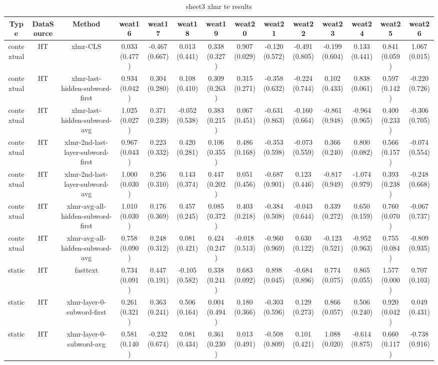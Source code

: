 \begin{sidewaystable}[htb]
    \centering
    \caption{sheet3 xlmr te results}
    \label{appendix_tab:sheet3_xlmr_te_results}
    \small
    \begin{tabular}{@{}cccccccccccccc@{}}
        \toprule
        Type & DataSource & Method & weat16 & weat17 & weat18 & weat19 & weat20 & weat21 & weat22 & weat23 & weat24 & weat25 & weat26 \\
        \midrule
        contextual & HT & xlmr-CLS & 0.033 (0.477) & -0.467 (0.667) & 0.013 (0.441) & 0.338 (0.327) & 0.907 (0.029) & -0.120 (0.572) & -0.491 (0.805) & -0.199 (0.604) & 0.133 (0.441) & 0.841 (0.059) & 1.067 (0.015) \\
        contextual & HT & xlmr-last-hidden-subword-first & 0.934 (0.042) & 0.304 (0.280) & 0.108 (0.410) & 0.309 (0.263) & 0.315 (0.271) & -0.358 (0.632) & -0.224 (0.744) & 0.102 (0.433) & 0.838 (0.061) & 0.597 (0.142) & -0.220 (0.726) \\
        contextual & HT & xlmr-last-hidden-subword-avg & 1.025 (0.027) & 0.371 (0.239) & -0.052 (0.538) & 0.383 (0.215) & 0.067 (0.451) & -0.631 (0.863) & -0.160 (0.664) & -0.861 (0.948) & -0.964 (0.965) & 0.400 (0.233) & -0.306 (0.705) \\
        contextual & HT & xlmr-2nd-last-layer-subword-first & 0.967 (0.043) & 0.223 (0.332) & 0.420 (0.281) & 0.106 (0.355) & 0.486 (0.168) & -0.353 (0.598) & -0.073 (0.559) & 0.366 (0.240) & 0.800 (0.082) & 0.566 (0.157) & -0.074 (0.554) \\
        contextual & HT & xlmr-2nd-last-layer-subword-avg & 1.000 (0.030) & 0.256 (0.310) & 0.143 (0.374) & 0.447 (0.202) & 0.051 (0.456) & -0.687 (0.901) & 0.123 (0.446) & -0.817 (0.949) & -1.074 (0.979) & 0.393 (0.238) & -0.248 (0.668) \\
        contextual & HT & xlmr-avg-all-hidden-subword-first & 1.010 (0.030) & 0.176 (0.369) & 0.457 (0.245) & 0.085 (0.372) & 0.403 (0.218) & -0.384 (0.508) & -0.043 (0.644) & 0.339 (0.272) & 0.650 (0.159) & 0.760 (0.070) & -0.067 (0.737) \\
        contextual & HT & xlmr-avg-all-hidden-subword-avg & 0.758 (0.090) & 0.248 (0.312) & 0.081 (0.421) & 0.424 (0.247) & -0.018 (0.513) & -0.960 (0.969) & 0.630 (0.122) & -0.123 (0.521) & -0.952 (0.963) & 0.755 (0.084) & -0.809 (0.935) \\
        static & HT & fasttext & 0.734 (0.091) & 0.447 (0.191) & -0.105 (0.582) & 0.338 (0.241) & 0.683 (0.092) & 0.898 (0.045) & -0.684 (0.896) & 0.774 (0.075) & 0.865 (0.055) & 1.577 (0.000) & 0.707 (0.103) \\
        static & HT & xlmr-layer-0-subword-first & 0.261 (0.321) & 0.363 (0.241) & 0.506 (0.164) & 0.004 (0.494) & 0.180 (0.366) & -0.303 (0.596) & 0.129 (0.273) & 0.866 (0.057) & 0.506 (0.240) & 0.920 (0.042) & 0.049 (0.431) \\
        static & HT & xlmr-layer-0-subword-avg & 0.581 (0.140) & -0.232 (0.674) & 0.081 (0.434) & 0.361 (0.230) & 0.013 (0.491) & -0.508 (0.809) & 0.101 (0.421) & 1.088 (0.020) & -0.614 (0.875) & 0.660 (0.117) & -0.738 (0.916) \\
        \bottomrule
    \end{tabular}
\end{sidewaystable}